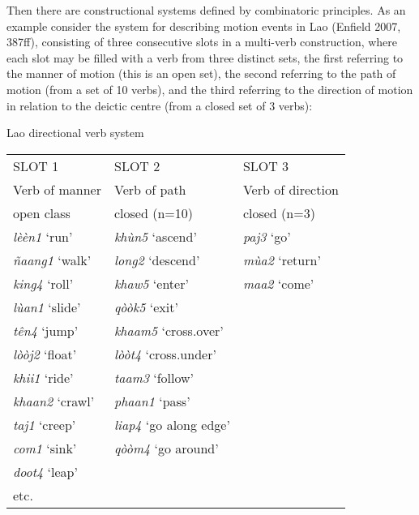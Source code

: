 Then there are constructional systems defined by combinatoric 
principles. As an example consider the system for describing motion 
events in Lao (Enfield 2007, 387ff), consisting of three consecutive 
slots in a multi-verb construction, where each slot may be filled with a 
verb from three distinct sets, the first referring to the manner of 
motion (this is an open set), the second referring to the path of motion 
(from a set of 10 verbs), and the third referring to the 
direction of motion in relation to the deictic centre (from a closed set 
of 3 verbs):

\newpage
\ea Lao directional verb system

\begin{table}[htbp]
      \begin{tabular}{lll}
  
    SLOT 1 & SLOT 2 & SLOT 3 \\

    Verb of manner & Verb of path & Verb of direction \\
    open class & closed (n=10) & closed (n=3) \\
    \textit{lèèn1} ‘run’ & \textit{khùn5} ‘ascend’ & \textit{paj3} ‘go’ \\
    \textit{ñaang1} ‘walk’ & \textit{long2} ‘descend’ & \textit{mùa2} ‘return’ \\
    \textit{king4} ‘roll’ & \textit{khaw5} ‘enter’ & \textit{maa2} ‘come’ \\
    \textit{lùan1} ‘slide’ & \textit{qòòk5} ‘exit’ &  \\
    \textit{tên4} ‘jump’ & \textit{khaam5} ‘cross.over’ &  \\
    \textit{lòòj2} ‘float’ & \textit{lòòt4} ‘cross.under’ &  \\
    \textit{khii1} ‘ride’ & \textit{taam3} ‘follow’ &  \\
    \textit{khaan2} ‘crawl’ & \textit{phaan1} ‘pass’ &  \\
    \textit{taj1} ‘creep’ & \textit{liap4} ‘go along edge’ &  \\
    \textit{com1} ‘sink’ & \textit{qòòm4} ‘go around’ &  \\
    \textit{doot4} ‘leap’ &       &  \\
    etc.  &       &  \\
   
    \end{tabular}%
  \label{tab:addlabel}%
\end{table}%

 \z



